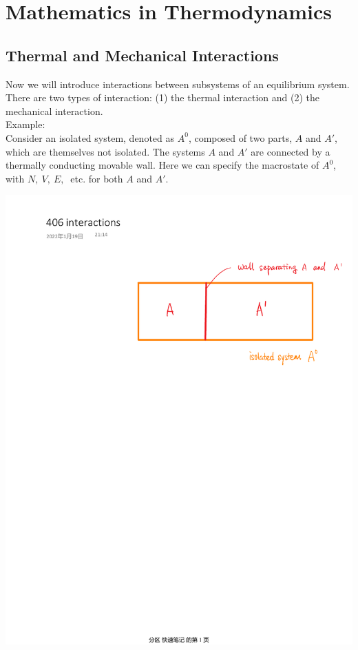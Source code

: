 \documentclass[11pt,oneside]{book}
\theoremstyle{break}
\theoremstyle{break}
\newcommand{\example}{\color{green}Example: \color{black}}
\begin{document}
\newpage
\chapter{Mathematics in Thermodynamics}

\section[Thermal and Mechanical Interactions]{\color{red}Thermal and Mechanical Interactions\color{black}}
Now we will introduce interactions between subsystems of an equilibrium system. \\There are two types of interaction: (1) the thermal interaction and (2) the mechanical interaction. \\

\example\\
Consider an isolated system, denoted as $A^0$, composed of two parts, $A$ and $A'$, which are themselves not isolated. The systems $A$ and $A'$ are connected by a thermally conducting movable wall. Here we can specify the macrostate of $A^0$, with $N,\ V,\ E,\ $ etc. for both $A$ and $A'$. \\
\begin{center}
\includegraphics[scale=0.5]{interaction.pdf}
\end{center}
\end{document}
